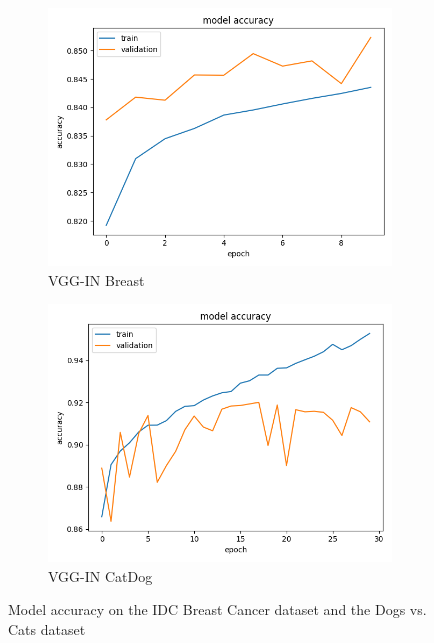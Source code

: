 \begin{figure}
\begin{subfigure}[b]{.45\linewidth}
\includegraphics[width=\linewidth]{Figs/vgg_in_breast_acc.jpg}
\caption{VGG-IN Breast}
\end{subfigure}
\begin{subfigure}[b]{.45\linewidth}
\includegraphics[width=\linewidth]{Figs/vgg_in_catdog_acc.jpg}
\caption{VGG-IN CatDog}
\end{subfigure}

\caption{Model accuracy on the IDC Breast Cancer dataset and the Dogs vs. Cats dataset}
\label{fig:acc2}
\end{figure}
